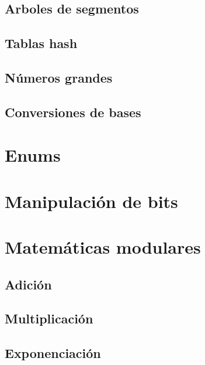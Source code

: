 \documentclass{article}
\begin{document}
\subsection{Arboles de segmentos}

\subsection{Tablas hash}

\subsection{Números grandes}

\subsection{Conversiones de bases}

\section{Enums}

\section{Manipulación de bits}

\section{Matemáticas modulares}

\subsection{Adición}

\subsection{Multiplicación}

\subsection{Exponenciación}
\end{document}
